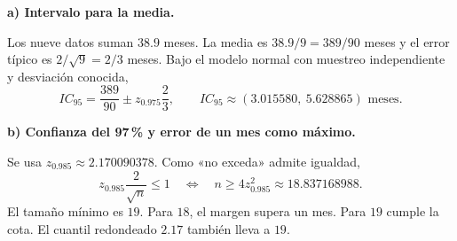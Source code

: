 \textbf{a) Intervalo para la media.}\par\nopagebreak[4]
Los nueve datos suman $38.9$ meses. La media es $38.9/9=389/90$ meses y el error típico es $2/\sqrt9=2/3$ meses. Bajo el modelo normal con muestreo independiente y desviación conocida,
\[
IC_{95}=\frac{389}{90}\pm z_{0.975}\frac23,\qquad
\boxed{IC_{95}\approx(3.015580,\ 5.628865)\text{ meses}.}
\]

\textbf{b) Confianza del 97\,\% y error de un mes como máximo.}\par\nopagebreak[4]
Se usa $z_{0.985}\approx2.170090378$. Como «no exceda» admite igualdad,
\[
z_{0.985}\frac2{\sqrt n}\leq1
\quad\Longleftrightarrow\quad n\geq4z_{0.985}^2\approx18.837168988.
\]
El tamaño mínimo es $\boxed{19}$. Para $18$, el margen supera un mes. Para $19$ cumple la cota. El cuantil redondeado $2.17$ también lleva a $19$.
